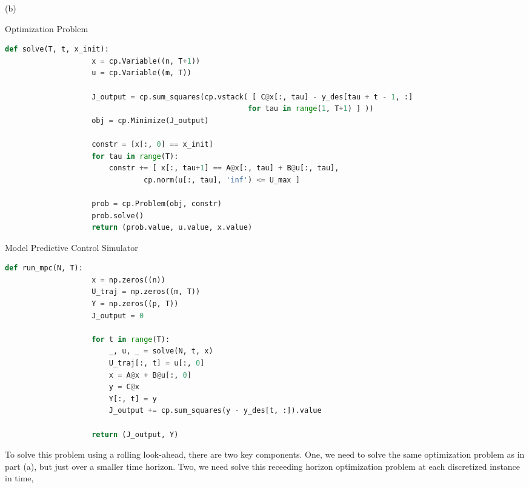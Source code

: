 \documentclass[12pt,reqno]{article}
\theoremstyle{definition}
\numberwithin{equation}{section}
\begin{document}
    \noindent (b) 
    \begin{algorithm}[htbp]
        \caption{Optimization Problem}
        \centering
            \begin{lstlisting}[language=Python]
                def solve(T, t, x_init):
                    x = cp.Variable((n, T+1))
                    u = cp.Variable((m, T))

                    J_output = cp.sum_squares(cp.vstack( [ C@x[:, tau] - y_des[tau + t - 1, :] 
                                                        for tau in range(1, T+1) ] ))
                    obj = cp.Minimize(J_output)

                    constr = [x[:, 0] == x_init]
                    for tau in range(T):
                        constr += [ x[:, tau+1] == A@x[:, tau] + B@u[:, tau],
                                cp.norm(u[:, tau], 'inf') <= U_max ]
                        
                    prob = cp.Problem(obj, constr)
                    prob.solve()
                    return (prob.value, u.value, x.value)
            \end{lstlisting}
        \label{alg:mpc-opt-problem}
    \end{algorithm}
    \begin{algorithm}[htbp]
        \caption{Model Predictive Control Simulator}
        \centering
            \begin{lstlisting}[language=Python]
                def run_mpc(N, T):
                    x = np.zeros((n))
                    U_traj = np.zeros((m, T))
                    Y = np.zeros((p, T))
                    J_output = 0
                    
                    for t in range(T):
                        _, u, _ = solve(N, t, x)
                        U_traj[:, t] = u[:, 0]
                        x = A@x + B@u[:, 0]
                        y = C@x
                        Y[:, t] = y
                        J_output += cp.sum_squares(y - y_des[t, :]).value

                    return (J_output, Y)
            \end{lstlisting}
        \label{alg:mpc-sim}
    \end{algorithm}
    To solve this problem using a rolling look-ahead, there are two key components. One, we need
    to solve the same optimization problem as in part (a), but just over a smaller time horizon. Two,
    we need solve this receeding horizon optimization problem at each discretized instance in time,
\end{document}
